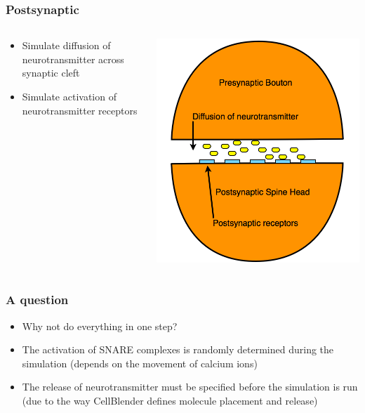 \documentclass{beamer}
\begin{document}
\frame
{
    \frametitle{Postsynaptic}
    \begin{columns}
    \begin{column}{0.5\textwidth}
    \begin{itemize}
        \item Simulate diffusion of neurotransmitter across synaptic cleft 
        \item Simulate activation of neurotransmitter receptors 
    \end{itemize}
    \end{column}
\begin{column}{0.5\textwidth}
    \includegraphics[width=1\textwidth]{postsynaptic.png}
    \end{column}
    \end{columns}
}

\frame
{ \frametitle{A question}
    \begin{itemize}
        \item Why not do everything in one step?
        \item The activation of SNARE complexes is randomly determined during the simulation (depends on the movement of calcium ions)
        \item The release of neurotransmitter must be specified before the simulation is run (due to the way CellBlender defines molecule placement and release)
    \end{itemize}
}
\end{document}

